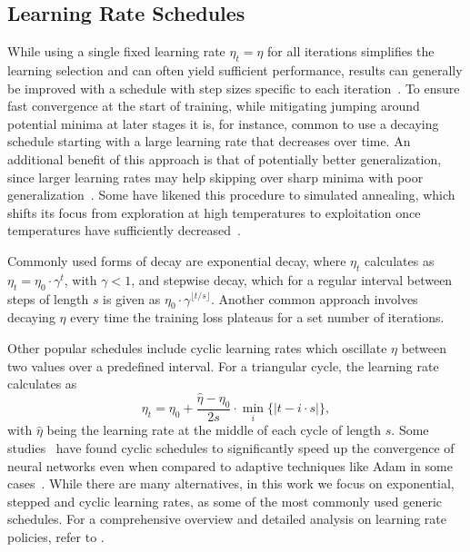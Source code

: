 \documentclass[runningheads]{llncs}
\begin{document}
\subsection{Learning Rate Schedules}

While using a single fixed learning rate $\eta_t = \eta$ for all iterations simplifies the learning selection and can often yield sufficient performance, results can generally be improved with a schedule with step sizes specific to each iteration~\cite{wuDemystifyingLearningRate2019b}.
To ensure fast convergence at the start of training, while mitigating jumping around potential minima at later stages it is, for instance, common to use a decaying schedule starting with a large learning rate that decreases over time.
An additional benefit of this approach is that of potentially better generalization, since larger learning rates may help skipping over sharp minima with poor generalization~\cite{hochreiterFlatMinima1997,chaudhariEntropySGDBiasingGradient2017}.
Some have likened this procedure to simulated annealing, which shifts its focus from exploration at high temperatures to exploitation once temperatures have sufficiently decreased~\cite{smithDonDecayLearning2018}.

Commonly used forms of decay are exponential decay, where $\eta_{t}$ calculates as
$\eta_{t} = \eta_0 \cdot \gamma^t$,
with $\gamma < 1$, and stepwise decay, which for a regular interval between steps of length $s$ is given as $\eta_0 \cdot \gamma^{\lfloor t/s \rfloor}$.
Another common approach involves decaying $\eta$ every time the training loss plateaus for a set number of iterations.

Other popular schedules include cyclic learning rates which oscillate $\eta$ between two values over a predefined interval.
For a triangular cycle, the learning rate calculates as
\begin{equation}
	\eta_t = \eta_0 + \frac{\hat{\eta} - \eta_0}{2s} \cdot \min_{i} \{|t-i\cdot s|\},
\end{equation}
with $\hat{\eta}$ being the learning rate at the middle of each cycle of length $s$.
Some studies~\cite{smithCyclicalLearningRates2017, smithSuperConvergenceVeryFast2018a} have found cyclic schedules to significantly speed up the convergence of neural networks even when compared to adaptive techniques like Adam in some cases~\cite{kingmaAdamMethodStochastic2017b}.
While there are many alternatives, in this work we focus on  exponential, stepped and cyclic learning rates, as some of the most commonly used generic schedules.
For a comprehensive overview and detailed analysis on learning rate policies, refer to \textcite{wuDemystifyingLearningRate2019b}.
\end{document}
